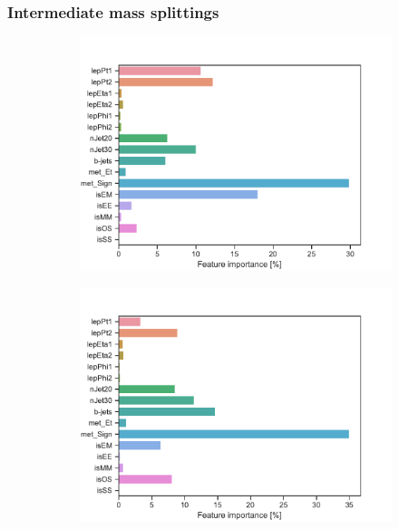 \subsubsection{Intermediate mass splittings}
\begin{figure}[H]
    \centering
    \begin{subfigure}[t!]{0.49\textwidth}
        \includegraphics[width = \textwidth]{Figures/SlepSlep/ML/BDT/Low_level/Inter/featureImportance.pdf}
        \caption{}
        \label{fig:featSlepslepLow}
    \end{subfigure}
    \begin{subfigure}[t!]{0.49\textwidth}
        \includegraphics[width = \textwidth]{Figures/SlepSnu/BDT/Low_level/Inter/featureImportance.pdf}

\end{subfigure}
\end{figure}
